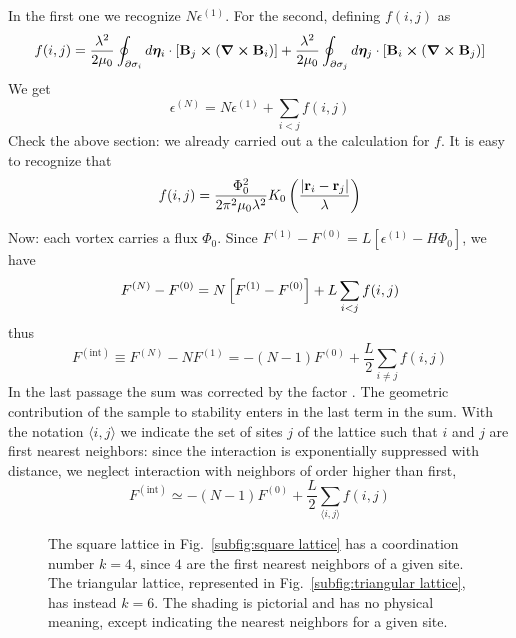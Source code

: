 In the first one we recognize $N\epsilon^{(1)}$. For the second, defining $f(i,j)$ as
\[
	f(i,j) = \frac{\lambda^2}{2\mu_0} \oint_{\partial\sigma_i} d\bm\eta_i \cdot \left[{ \mathbf{B}_j \bm{\times} \left({\curl\mathbf{B}_i }\right) }\right] + \frac{\lambda^2}{2\mu_0} \oint_{\partial\sigma_j} d\bm\eta_j \cdot \left[{ \mathbf{B}_i \bm{\times} \left({\curl\mathbf{B}_j }\right) }\right]
\]
We get
\[
	\epsilon^{(N)} = N\epsilon^{(1)} + \sum_{i<j} f(i,j)
\]
Check the above section: we already carried out a the calculation for $f$. It is easy to recognize that
\[
	f(i,j) = \frac{\Phi_0^2}{2\pi^2\mu_0 \lambda^2} K_0 \left({\frac{\abs{\mathbf{r}_i-\mathbf{r}_j}}{\lambda}}\right)
\]

Now: each vortex carries a flux $\Phi_0$. Since $F^{(1)} - F^{(0)} = L[ \epsilon^{(1)}-H\Phi_0 ]$, we have
\[
	F^{(N)} - F^{(0)} = N \left[{F^{(1)} - F^{(0)}}\right] + L \sum_{i<j} f(i,j)
\]
thus
\[
	F^{(\mathrm{int})} \equiv F^{(N)} - N F^{(1)} = - (N-1) F^{(0)} + \frac{L}{2} \sum_{i\neq j} f(i,j)
\]
In the last passage the sum was corrected by the factor \half.
The geometric contribution of the sample to stability enters in the last term in the sum. With the notation $\langle i,j \rangle$ we indicate the set of sites $j$ of the lattice such that $i$ and $j$ are first nearest neighbors: since the interaction is exponentially suppressed with distance, we neglect interaction with neighbors of order higher than first,
\[
	F^{(\mathrm{int})} \simeq - (N-1) F^{(0)} + \frac{L}{2} \sum_{\langle i,j \rangle} f(i,j)
\]

\begin{figure}
	\centering
	\def\myscale{0.8}
	\hfil
	\caption{The square lattice in Fig.~\ref{subfig:square lattice} has a coordination number $k=4$, since $4$ are the first nearest neighbors of a given site. The triangular lattice, represented in Fig.~\ref{subfig:triangular lattice}, has instead $k=6$. The shading is pictorial and has no physical meaning, except indicating the nearest neighbors for a given site.}
	\label{fig:lattices}
\end{figure}

